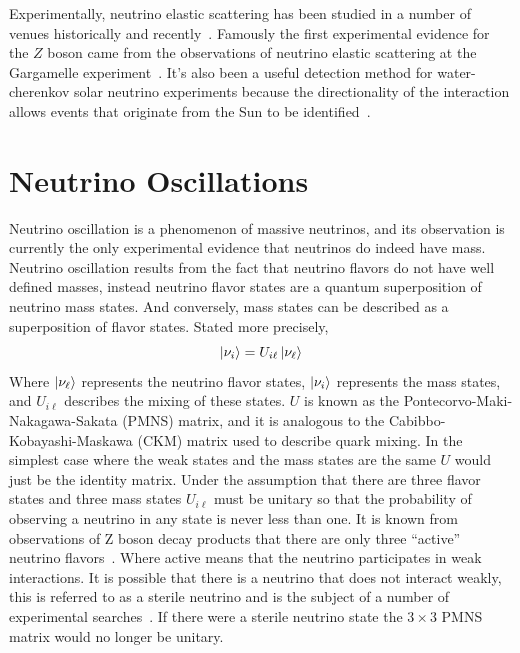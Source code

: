 Experimentally, neutrino elastic scattering has been studied in a number
of venues historically and recently~\citep{reines2, es_measurement, nutev}.
Famously the first experimental evidence for the $Z$ boson came from
the observations of neutrino elastic scattering at the
Gargamelle experiment~\citep{gargamelle}.
It's also been a useful detection method for water-cherenkov solar
neutrino experiments because the directionality of the interaction
allows events that originate from the Sun to be identified~\citep{sno_first,
kamiokande, superk_first_solar}.

\section{Neutrino Oscillations}
\label{sec:neut_osc}
Neutrino oscillation is a phenomenon of massive neutrinos, and its observation
is currently the only experimental evidence that neutrinos do indeed have mass.
Neutrino oscillation results from the fact that neutrino flavors do not have
well defined masses, instead neutrino flavor states are a quantum superposition
of neutrino mass states.
And conversely, mass states can be described as a superposition of flavor states.
Stated more precisely,
\begin{equation}
    \ket{\nu_{i}} = U_{i\ell}\ket{\nu_\ell}
\end{equation}
Where $\ket{\nu_\ell}$ represents the neutrino flavor states, $\ket{\nu_i}$
represents the mass states, and $U_{i\ell}$ describes the mixing of these
states.
$U$ is known as the Pontecorvo-Maki-Nakagawa-Sakata (PMNS) matrix,
and it is analogous to the Cabibbo-Kobayashi-Maskawa (CKM) matrix used
to describe quark mixing.
In the simplest case where the weak states and the mass states are the same
$U$ would just be the identity matrix.
Under the assumption that there are three flavor states and three mass states
$U_{i\ell}$ must be unitary so that the probability of observing
a neutrino in any state is never less than one.
It is known from observations of Z boson decay products that
there are only three ``active'' neutrino flavors~\citep{Zdecay}.
Where active means that the neutrino participates in
weak interactions.
It is possible that there is a neutrino that does not interact
weakly, this is referred to as a sterile neutrino and is the
subject of a number of experimental searches~\citep{prospect, lsnd, miniboone, jsns2}.
If there were a sterile neutrino state the $3\times3$ PMNS matrix would
no longer be unitary.

